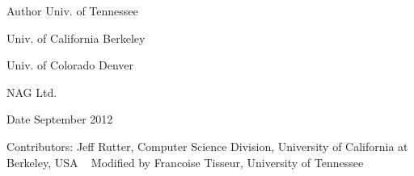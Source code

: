 \begin{DoxyAuthor}{Author}
Univ. of Tennessee 

Univ. of California Berkeley 

Univ. of Colorado Denver 

N\+A\+G Ltd. 
\end{DoxyAuthor}
\begin{DoxyDate}{Date}
September 2012 
\end{DoxyDate}
\begin{DoxyParagraph}{Contributors\+: }
Jeff Rutter, Computer Science Division, University of California at Berkeley, U\+S\+A ~\newline
 Modified by Francoise Tisseur, University of Tennessee 
\end{DoxyParagraph}
